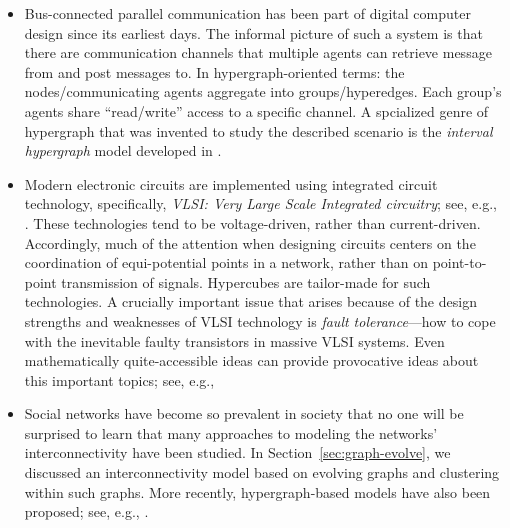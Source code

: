 \begin{itemize}
\item
Bus-connected parallel communication has been part of digital computer
 design since
its earliest days.  The informal picture of such a system is that
there are communication channels that multiple agents can retrieve
message from and post messages to.  In hypergraph-oriented terms: the
nodes/communicating agents aggregate into groups/hyperedges.  Each
group's agents share ``read/write'' access to a specific channel.  A
spcialized genre of hypergraph that was invented to study the
described scenario is the {\it interval hypergraph}
 model developed in
\cite{Rosenberg89a}.

\item
Modern electronic circuits are implemented using integrated circuit
 technology,
specifically, {\em VLSI: Very Large Scale Integrated circuitry}; see,
e.g., \cite{Mead-Conway}.  These technologies tend to be
voltage-driven, rather than current-driven.  Accordingly, much of the
attention when designing circuits centers on the coordination of
equi-potential points in a network, rather than on point-to-point
transmission of signals.  Hypercubes are tailor-made for such
technologies.  A crucially important issue that arises because of the
design strengths and weaknesses of  VLSI technology is {\it fault
  tolerance}---how to cope with the inevitable faulty transistors in
massive VLSI systems.  Even mathematically quite-accessible ideas can
provide provocative ideas about this important topics; see, e.g.,
\cite{Rosenberg85a}

\item
Social networks have become so prevalent in society that no one will
be surprised to learn that many approaches to modeling the networks'
interconnectivity have been studied.  In
Section~\ref{sec:graph-evolve}, we discussed an interconnectivity
model based on evolving graphs and clustering within such graphs.
More recently, hypergraph-based models
have also been proposed; see, e.g., \cite{Amatoetal17,LiuBV10}.
\end{itemize}





